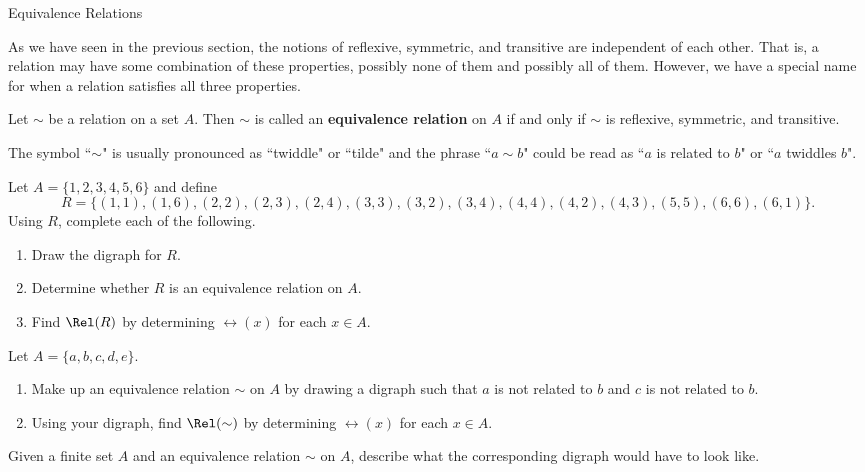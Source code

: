 \begin{section}{Equivalence Relations}

As we have seen in the previous section, the notions of reflexive, symmetric, and transitive are independent of each other. That is, a relation may have some combination of these properties, possibly none of them and possibly all of them.  However, we have a special name for when a relation satisfies all three properties.

\begin{definition}
Let $\sim$ be a relation on a set $A$.  Then $\sim$ is called an \textbf{equivalence relation} on $A$ if and only if $\sim$ is reflexive, symmetric, and transitive.
\end{definition}

The symbol ``$\sim$" is usually pronounced as ``twiddle" or ``tilde" and the phrase ``$a\sim b$" could be read as ``$a$ is related to $b$" or ``$a$ twiddles $b$".

\begin{problem}\label{prob:digraph}
Let $A=\{1,2,3,4,5,6\}$ and define
\[
R=\{(1,1),(1,6),(2,2),(2,3),(2,4),(3,3),(3,2),(3,4),(4,4),(4,2),(4,3),(5,5),(6,6),(6,1)\}.
\]
Using $R$, complete each of the following.
\begin{enumerate}[label=\textrm{(\alph*)}]
\item Draw the digraph for $R$.
\item Determine whether $R$ is an equivalence relation on $A$.
\item Find $\Rel(R)$ by determining $\rel(x)$ for each $x\in A$.
\end{enumerate}
\end{problem}

\begin{problem}\label{prob:made up}
Let $A=\{a,b,c,d,e\}$.  
\begin{enumerate}[label=\textrm{(\alph*)}]
\item Make up an equivalence relation $\sim$ on $A$ by drawing a digraph such that $a$ is not related to $b$ and $c$ is not related to $b$.  
\item Using your digraph, find $\Rel(\sim)$ by determining $\rel(x)$ for each $x\in A$.
\end{enumerate}
\end{problem}

\begin{problem}
Given a finite set $A$ and an equivalence relation $\sim$ on $A$, describe what the corresponding digraph would have to look like.
\end{problem}


\end{section}
